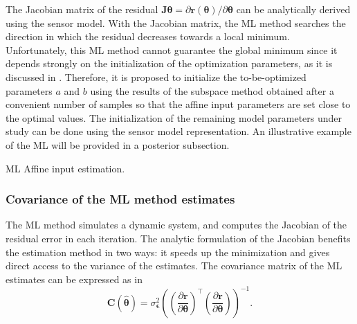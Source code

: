 The Jacobian matrix of the residual $\mathbf{J}\bm{\theta} = \partial \mathbf{r}(\bm{\theta}) / \partial \bm{\theta}$ can be analytically derived using the sensor model.
With the Jacobian matrix, the ML method searches the direction in which the residual decreases towards a local minimum.
Unfortunately, this ML method cannot guarantee the global minimum since it depends strongly on the initialization of the optimization parameters, as it is discussed in \citet{Nocedal06}.
Therefore, it is proposed to initialize the to-be-optimized parameters $a$ and $b$ using the results of the subspace method obtained after a convenient number of samples so that the affine input parameters are set close to the optimal values.
The initialization of the remaining model parameters under study can be done using the sensor model representation.
An illustrative example of the ML will be provided in a posterior subsection.  
\color{black}

\begin{algorithm} 
\caption{ML Affine input estimation.}\label{Alg1}
\begin{algorithmic}
\ENDFOR
{} {}

\end{algorithmic}
\end{algorithm}



\subsubsection{Covariance of the ML method estimates}

The ML method simulates a dynamic system, and computes the Jacobian of the residual error in each iteration.
The analytic formulation of the Jacobian benefits the estimation method in two ways: it speeds up the minimization and gives direct access to the variance of the estimates.
The covariance matrix of the ML estimates can be expressed as in \citet{Pintelon12Book}
\begin{equation} \mathbf{C} \left( \widehat{\bm{\theta}} \right) = \sigma_{\bm{\epsilon}}^2 \left( \left( \dfrac{\partial \mathbf{r} }{ \partial \bm{\theta} } \right)^\top \left( \dfrac{\partial \mathbf{r} }{ \partial \bm{\theta} } \right) \right)^{-1}. \label{eqn:covOpt} \end{equation}


